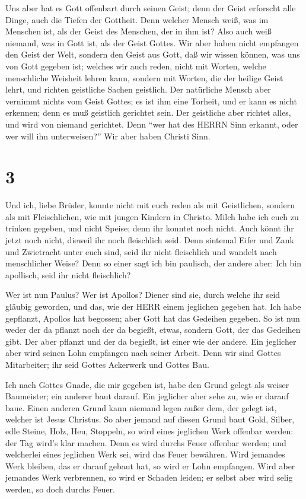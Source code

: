  Uns aber hat es Gott offenbart durch seinen Geist; denn
der Geist erforscht alle Dinge, auch die Tiefen der Gottheit.
 Denn welcher Mensch weiß, was im Menschen ist, als der
Geist des Menschen, der in ihm ist? Also auch weiß niemand, was in Gott
ist, als der Geist Gottes.  Wir aber haben nicht empfangen
den Geist der Welt, sondern den Geist aus Gott, daß wir wissen können,
was uns von Gott gegeben ist;  welches wir auch reden,
nicht mit Worten, welche menschliche Weisheit lehren kann, sondern mit
Worten, die der heilige Geist lehrt, und richten geistliche Sachen
geistlich.  Der natürliche Mensch aber vernimmt nichts vom
Geist Gottes; es ist ihm eine Torheit, und er kann es nicht erkennen;
denn es muß geistlich gerichtet sein.  Der geistliche aber
richtet alles, und wird von niemand gerichtet.  Denn ``wer
hat des HERRN Sinn erkannt, oder wer will ihn unterweisen?'' Wir aber
haben Christi Sinn.

\hypertarget{section-2}{%
\section{3}\label{section-2}}

 Und ich, liebe Brüder, konnte nicht mit euch reden als mit
Geistlichen, sondern als mit Fleischlichen, wie mit jungen Kindern in
Christo.  Milch habe ich euch zu trinken gegeben, und nicht
Speise; denn ihr konntet noch nicht. Auch könnt ihr jetzt noch nicht,
 dieweil ihr noch fleischlich seid. Denn sintemal Eifer und
Zank und Zwietracht unter euch sind, seid ihr nicht fleischlich und
wandelt nach menschlicher Weise?  Denn so einer sagt ich bin
paulisch, der andere aber: Ich bin apollisch, seid ihr nicht
fleischlich?

 Wer ist nun Paulus? Wer ist Apollos? Diener sind sie, durch
welche ihr seid gläubig geworden, und das, wie der HERR einem jeglichen
gegeben hat.  Ich habe gepflanzt, Apollos hat begossen; aber
Gott hat das Gedeihen gegeben.  So ist nun weder der da
pflanzt noch der da begießt, etwas, sondern Gott, der das Gedeihen gibt.
 Der aber pflanzt und der da begießt, ist einer wie der
andere. Ein jeglicher aber wird seinen Lohn empfangen nach seiner
Arbeit.  Denn wir sind Gottes Mitarbeiter; ihr seid Gottes
Ackerwerk und Gottes Bau.

 Ich nach Gottes Gnade, die mir gegeben ist, habe den Grund
gelegt als weiser Baumeister; ein anderer baut darauf. Ein jeglicher
aber sehe zu, wie er darauf baue.  Einen anderen Grund kann
niemand legen außer dem, der gelegt ist, welcher ist Jesus Christus.
 So aber jemand auf diesen Grund baut Gold, Silber, edle
Steine, Holz, Heu, Stoppeln,  so wird eines jeglichen Werk
offenbar werden: der Tag wird's klar machen. Denn es wird durchs Feuer
offenbar werden; und welcherlei eines jeglichen Werk sei, wird das Feuer
bewähren.  Wird jemandes Werk bleiben, das er darauf gebaut
hat, so wird er Lohn empfangen.  Wird aber jemandes Werk
verbrennen, so wird er Schaden leiden; er selbst aber wird selig werden,
so doch durchs Feuer.


